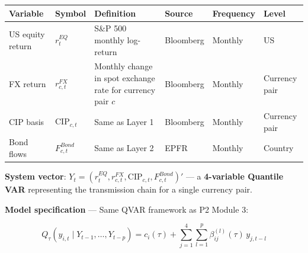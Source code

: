 \documentclass[11pt,a4paper]{article}
\begin{document}
{\small
\begin{longtable}{|p{}|p{}|p{}|p{}|p{}|p{}|}
\hline
\textbf{Variable} & \textbf{Symbol} & \textbf{Definition} & \textbf{Source} & \textbf{Frequency} & \textbf{Level} \\
\hline
\endhead
US equity return & $r_t^{EQ}$ & S\&P 500 monthly log-return & Bloomberg & Monthly & US \\
\hline
FX return & $r_{c,t}^{FX}$ & Monthly change in spot exchange rate for currency pair $c$ & Bloomberg & Monthly & Currency pair \\
\hline
CIP basis & $\text{CIP}_{c,t}$ & Same as Layer 1 & Bloomberg & Monthly & Currency pair \\
\hline
Bond flows & $F_{c,t}^{Bond}$ & Same as Layer 2 & EPFR & Monthly & Country \\
\hline
\end{longtable}
}

\textbf{System vector}: $Y_t = (r_t^{EQ}, r_{c,t}^{FX}, \text{CIP}_{c,t}, F_{c,t}^{Bond})'$ --- a \textbf{4-variable Quantile VAR} representing the transmission chain for a single currency pair.

\textbf{Model specification} --- Same QVAR framework as P2 Module 3:

\[Q_{\tau}(y_{i,t} \mid Y_{t-1}, \ldots, Y_{t-p}) = c_i(\tau) + \sum_{j=1}^{4} \sum_{l=1}^{p} \beta_{ij}^{(l)}(\tau) \, y_{j,t-l}\]
\end{document}

